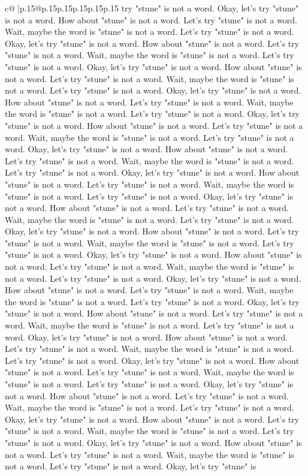 \documentclass{article}
\begin{document}
{\begin{supertabular}{c@{$\;$}|p{.15\linewidth}@{}p{.15\linewidth}p{.15\linewidth}p{.15\linewidth}p{.15\linewidth}p{.15\linewidth}}
{{{try "stune" is not a word. Okay, let's try "stune" is not a word. How about "stune" is not a word. Let's try "stune" is not a word. Wait, maybe the word is "stune" is not a word. Let's try "stune" is not a word. Okay, let's try "stune" is not a word. How about "stune" is not a word. Let's try "stune" is not a word. Wait, maybe the word is "stune" is not a word. Let's try "stune" is not a word. Okay, let's try "stune" is not a word. How about "stune" is not a word. Let's try "stune" is not a word. Wait, maybe the word is "stune" is not a word. Let's try "stune" is not a word. Okay, let's try "stune" is not a word. How about "stune" is not a word. Let's try "stune" is not a word. Wait, maybe the word is "stune" is not a word. Let's try "stune" is not a word. Okay, let's try "stune" is not a word. How about "stune" is not a word. Let's try "stune" is not a word. Wait, maybe the word is "stune" is not a word. Let's try "stune" is not a word. Okay, let's try "stune" is not a word. How about "stune" is not a word. Let's try "stune" is not a word. Wait, maybe the word is "stune" is not a word. Let's try "stune" is not a word. Okay, let's try "stune" is not a word. How about "stune" is not a word. Let's try "stune" is not a word. Wait, maybe the word is "stune" is not a word. Let's try "stune" is not a word. Okay, let's try "stune" is not a word. How about "stune" is not a word. Let's try "stune" is not a word. Wait, maybe the word is "stune" is not a word. Let's try "stune" is not a word. Okay, let's try "stune" is not a word. How about "stune" is not a word. Let's try "stune" is not a word. Wait, maybe the word is "stune" is not a word. Let's try "stune" is not a word. Okay, let's try "stune" is not a word. How about "stune" is not a word. Let's try "stune" is not a word. Wait, maybe the word is "stune" is not a word. Let's try "stune" is not a word. Okay, let's try "stune" is not a word. How about "stune" is not a word. Let's try "stune" is not a word. Wait, maybe the word is "stune" is not a word. Let's try "stune" is not a word. Okay, let's try "stune" is not a word. How about "stune" is not a word. Let's try "stune" is not a word. Wait, maybe the word is "stune" is not a word. Let's try "stune" is not a word. Okay, let's try "stune" is not a word. How about "stune" is not a word. Let's try "stune" is not a word. Wait, maybe the word is "stune" is not a word. Let's try "stune" is not a word. Okay, let's try "stune" is not a word. How about "stune" is not a word. Let's try "stune" is not a word. Wait, maybe the word is "stune" is not a word. Let's try "stune" is not a word. Okay, let's try "stune" is not a word. How about "stune" is not a word. Let's try "stune" is not a word. Wait, maybe the word is "stune" is not a word. Let's try "stune" is not a word. Okay, let's try "stune" is not a word. How about "stune" is not a word. Let's try "stune" is not a word. Wait, maybe the word is "stune" is not a word. Let's try "stune" is not a word. Okay, let's try "stune" is not a word. How about "stune" is not a word. Let's try "stune" is not a word. Wait, maybe the word is "stune" is not a word. Let's try "stune" is not a word. Okay, let's try "stune" is }}}
\end{supertabular}}
\end{document}
